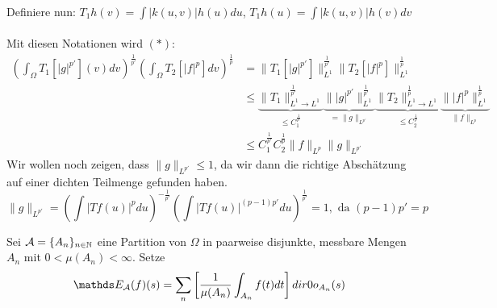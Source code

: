 \begin{beweis}
\begin{itemize}
\begin{align*}
			\end{align*}
			Definiere nun: $T_{1} h(v) = \int |k(u, v)| h(u) du$, $T_{1} h(u) = \int |k(u, v)| h(v) dv $ \\ \\
			Mit diesen Notationen wird $(*)$:
			\begin{align*}
				\left( \int_{\Omega} T_{1}[|g|^{p'}](v) dv \right)^{\frac{1}{p'}} \left( \int_{\Omega} T_{2} [|f|^{p}] dv \right)^{\frac{1}{p}} & = \| T_{1}[|g|^{p'}] \|_{L^{1}}^{\frac{1}{p'}} \| T_{2}[|f|^{p}] \|_{L^{1}}^{\frac{1}{p}} \\
				& \leq \underbrace{\| T_{1} \|_{L^{1} \rightarrow L^{1}}^{\frac{1}{p'}}}_{\leq C_{1}^{\frac{1}{p'}}} \underbrace{\||g|^{p'}\|_{L^{1}}^{\frac{1}{p'}}}_{= \|g\|_{L^{p'}}} \underbrace{\| T_{2} \|_{L^{1} \rightarrow L^{1}}^{\frac{1}{p}}}_{\leq C_{2}^{\frac{1}{p}}} \underbrace{\||f|^{p}\|_{L^{1}}^{\frac{1}{p}}}_{\| f \|_{L^{p}}} \\
            & \leq C_{1}^{\frac{1}{p'}} C_{2}^{\frac{1}{p}} \| f \|_{L^{p}} \| g \|_{L^{p'}}
            \end{align*}
            Wir wollen noch zeigen, dass $\| g \|_{L^{p'}} \leq 1$, da wir dann die richtige Abschätzung auf einer dichten Teilmenge gefunden haben.
            \[ \| g \|_{L^{p'}} = \left( \int | T f(u) |^{p} du \right)^{- \frac{1}{p'}} \left( \int |T f(u)|^{(p-1)p'} du \right)^{\frac{1}{p'}} = 1, \text{ da } (p - 1) p' = p \]
    \end{itemize}	
\end{beweis}


\begin{definition} 
	Sei $\mathcal{A} = \{ A_{n} \}_{n \in \mathbb{N}}$ eine Partition von $\Omega$ in paarweise disjunkte, messbare Mengen $A_{n}$ mit $0 < \mu(A_{n}) < \infty$. Setze
	\[ \EW_{\ca}(f)(s) = \sum_{n} \left[ \frac{1}{\mu(A_{n})} \int_{A_{n}} f(t) dt \right] \1_{A_{n}}(s) \] 
\end{definition}



